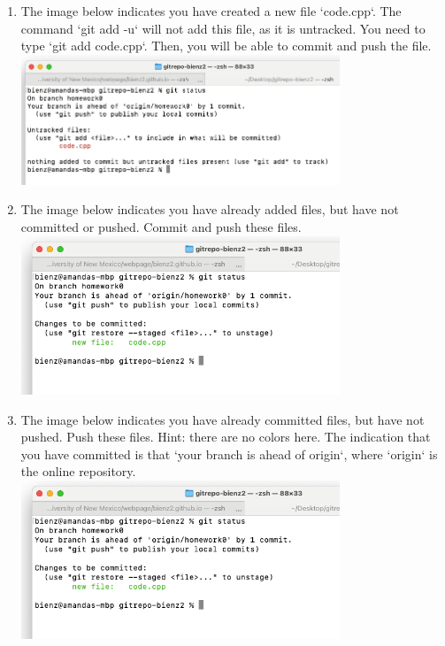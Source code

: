 \documentclass{article} %
\begin{document}
\begin{enumerate}
\begin{enumerate}
        \item The image below indicates you have created a new file `code.cpp`.  The command `git add -u` will not add this file, as it is untracked.  You need to type `git add code.cpp`.  Then, you will be able to commit and push the file.\\
        \includegraphics[width=0.75\textwidth]{figs/untracked.png}

        \item The image below indicates you have already added files, but have not committed or pushed.  Commit and push these files.\\
        \includegraphics[width=0.75\textwidth]{figs/added.png}

        \item The image below indicates you have already committed files, but have not pushed.  Push these files.  Hint: there are no colors here.  The indication that you have committed is that `your branch is ahead of origin`, where `origin` is the online repository.\\
        \includegraphics[width=0.75\textwidth]{figs/added.png}


\end{enumerate}
\end{enumerate}
\end{document}
